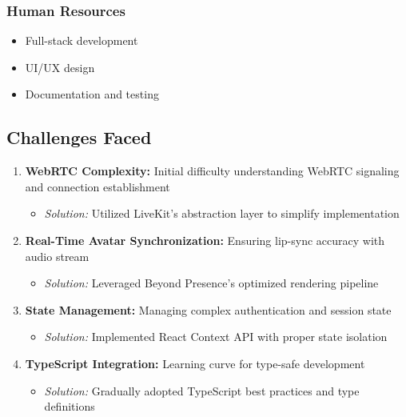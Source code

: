 \documentclass[11pt,a4paper]{article}
\begin{document}
\subsubsection{Human Resources}
\begin{itemize}
    \item Full-stack development
    \item UI/UX design
    \item Documentation and testing
\end{itemize}

\subsection{Challenges Faced}

\begin{enumerate}
    \item \textbf{WebRTC Complexity:} Initial difficulty understanding WebRTC signaling and connection establishment
    \begin{itemize}
        \item \textit{Solution:} Utilized LiveKit's abstraction layer to simplify implementation
    \end{itemize}
    
    \item \textbf{Real-Time Avatar Synchronization:} Ensuring lip-sync accuracy with audio stream
    \begin{itemize}
        \item \textit{Solution:} Leveraged Beyond Presence's optimized rendering pipeline
    \end{itemize}
    
    \item \textbf{State Management:} Managing complex authentication and session state
    \begin{itemize}
        \item \textit{Solution:} Implemented React Context API with proper state isolation
    \end{itemize}
    
    \item \textbf{TypeScript Integration:} Learning curve for type-safe development
    \begin{itemize}
        \item \textit{Solution:} Gradually adopted TypeScript best practices and type definitions
    \end{itemize}
\end{enumerate}
\end{document}
